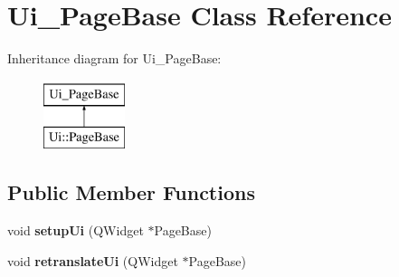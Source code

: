 \hypertarget{class_ui___page_base}{}\section{Ui\+\_\+\+Page\+Base Class Reference}
\label{class_ui___page_base}
Inheritance diagram for Ui\+\_\+\+Page\+Base\+:\begin{figure}[H]
\begin{center}
\leavevmode
\includegraphics[height=2.000000cm]{class_ui___page_base}
\end{center}
\end{figure}
\subsection*{Public Member Functions}
\begin{DoxyCompactItemize}
\item 
\mbox{\label{class_ui___page_base_acc391e1be2896c7951eac2684b17f88b}} 
void {\bfseries setup\+Ui} (Q\+Widget $\ast$Page\+Base)
\item 
\mbox{\label{class_ui___page_base_af3e7965fbbadeb2cefebad92469cc8b8}} 
void {\bfseries retranslate\+Ui} (Q\+Widget $\ast$Page\+Base)
\end{DoxyCompactItemize}
